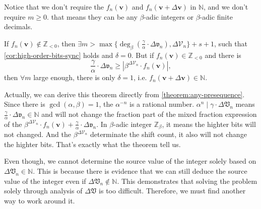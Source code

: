Notice that we don't require the $f_{n}(\bm{v})$ and $f_{n}(\bm{v} + \Delta\bm{v})$ in $\mathbb{N}$, and we don't require $m \ge 0$. that means they can be any $\beta$-adic integers or $\beta$-adic finite decimals.
\begin{remark}
    If $f_{n}(\bm{v}) \not\in \mathbb{Z}_{<0}$, then $\exists m > \max\{\deg_{\beta}(\frac{\gamma}{\alpha}\cdot\Delta\mathfrak{v}_{n}), \Delta\mathcal{V}_n\} + s + 1$, such that \cref{cor:high-order-bits-sync} holds and $\delta = 0$. But if $f_{n}(\bm{v}) \in \mathbb{Z}_{<0}$ and there is
    \[ \frac{\gamma}{\alpha}\cdot\Delta\mathfrak{v}_{n} \ge \left\vert \beta^{\Delta\mathcal{V}_n}\cdot f_{n}(\bm{v}) \right\vert, \]
    then $\forall m$ large enough, there is only $\delta = 1$, i.e. $f_{n}(\bm{v} + \Delta\bm{v}) \in \mathbb{N}$.
\end{remark}
Actually, we can derive this theorem directly from \cref{theorem:any-presequence}.
Since there is $\gcd(\alpha, \beta) = 1$, the $\alpha^{-n}$ is a rational number. $\alpha^{n} \mid \gamma\cdot\Delta\mathfrak{V}_{n}$ means $\frac{\gamma}{\alpha}\cdot\Delta\mathfrak{v}_{n} \in \mathbb{N}$ and will not change the fraction part of the mixed fraction expression of the $\beta^{\Delta\mathcal{V}_{n}}\cdot f_{n}(\bm{v}) + \frac{\gamma}{\alpha} \cdot \Delta\mathfrak{v}_{n}$.
In $\beta$-adic integer $\mathbb{Z}_{\beta}$, it means the highter bits will not changed.
And the $\beta^{\Delta\mathcal{V}_{n}}$ determinate the shift count, it also will not change the highter bits. That's exactly what the theorem tell us.

Even though, we cannot determine the source value of the integer solely based on $\Delta\mathfrak{V}_{n}\in\mathbb{N}$. This is because there is evidence that we can still deduce the source value of the integer even if $\Delta\mathfrak{V}_{n}\not\in\mathbb{N}$. This demonstrates that solving the problem solely through analysis of $\Delta\mathfrak{V}$ is too difficult. Therefore, we must find another way to work around it.

